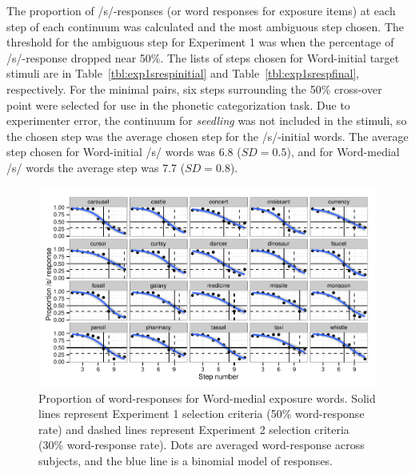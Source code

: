 The proportion of /s/-responses (or word responses for exposure items) at each step of each continuum was calculated and the most ambiguous step chosen. 
The threshold for the ambiguous step for Experiment 1 was when the percentage of /s/-response dropped near 50\%. 
The lists of steps chosen for Word-initial target stimuli are in Table~\ref{tbl:exp1srespinitial} and Table~\ref{tbl:exp1srespfinal}, respectively.
For the minimal pairs, six steps surrounding the 50\% cross-over point were selected for use in the phonetic categorization task.  
Due to experimenter error, the continuum for \emph{seedling} was not included in the stimuli, so the chosen step was the average chosen step for the /s/-initial words.  
The average step chosen for Word-initial /s/ words was 6.8 ($SD = 0.5$), and for Word-medial /s/ words the average step was 7.7 ($SD = 0.8$).


\begin{figure}[ht]
\caption{Proportion of word-responses for Word-medial exposure words. Solid lines represent Experiment 1 selection criteria (50\% word-response rate) and dashed lines represent Experiment 2 selection criteria (30\% word-response rate).  Dots are averaged word-response across subjects, and the blue line is a binomial model of responses.}
\label{fig:sfinalpretest}
\begin{center}
\includegraphics[width=\textwidth]{graphs/sfinalpretest.pdf}
\end{center}
\end{figure}


